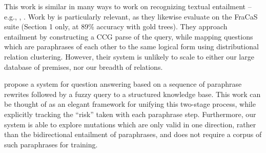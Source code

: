 This work is similar in many ways to work on 
  recognizing textual entailment -- e.g., 
  , .
Work by  is particularly relevant,
  as they likewise evaluate on the FraCaS suite (Section 1 only, at
  89\% accuracy with gold trees).
They approach entailment by constructing a CCG parse of the query,
  while mapping questions which are paraphrases of each other to the
  same logical form using distributional relation clustering.
However, their system is unlikely to scale to either our large
  database of premises, nor our breadth of relations.

 propose a system for question answering
  based on a sequence of paraphrase rewrites followed by a fuzzy query to
  a structured knowledge base.
This work can be thought of as an elegant framework for unifying this
  two-stage process, while explicitly tracking the ``risk'' taken with
  each paraphrase step.
Furthermore, our system is able to explore mutations which are only
  valid in one direction, rather than the bidirectional entailment of
  paraphrases, and does not require a corpus of such paraphrases for
  training.
  
